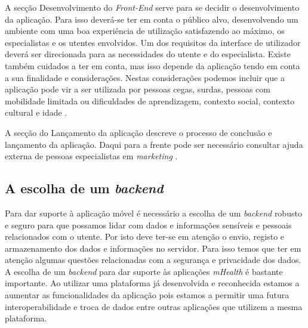 \par 
A secção Desenvolvimento do \textit{Front-End} serve para se decidir o desenvolvimento da aplicação. Para isso deverá-se ter em conta o público alvo, desenvolvendo um ambiente com uma boa experiência de utilização satisfazendo ao máximo, os especialistas e os utentes envolvidos. Um dos requisitos da interface de utilizador deverá ser direcionada para as necessidades do utente e do especialista. Existe também cuidados a ter em conta, mas isso depende da aplicação tendo em conta a sua finalidade e considerações. Nestas considerações podemos incluir que a aplicação pode vir a ser utilizada por pessoas  cegas, surdas, pessoas com mobilidade limitada ou dificuldades de aprendizagem, contexto social, contexto cultural e idade \cite{mhealth-pipeline}.
\par 
A secção do Lançamento da aplicação descreve o processo de conclusão e lançamento da aplicação. Daqui para a frente pode ser necessário consultar ajuda externa de pessoas especialistas em \textit{marketing} \cite{mhealth-pipeline}. 




\subsection{A escolha de um \textit{backend}}
Para dar suporte à aplicação móvel é necessário a escolha de um \textit{backend} robusto e seguro para que possamos lidar com dados e informações sensíveis e pessoais relacionados com o utente. Por isto deve ter-se em atenção o envio, registo e armazenamento dos dados e informações no servidor. Para isso temos que ter em atenção algumas questões relacionadas com a segurança e privacidade dos dados. A escolha de um \textit{backend} para dar suporte às aplicações \textit{mHealth} é bastante importante. Ao utilizar uma plataforma já desenvolvida e reconhecida estamos a aumentar as funcionalidades da aplicação pois estamos a permitir uma futura interoperabilidade e troca de dados entre outras aplicações que utilizem a mesma plataforma.




